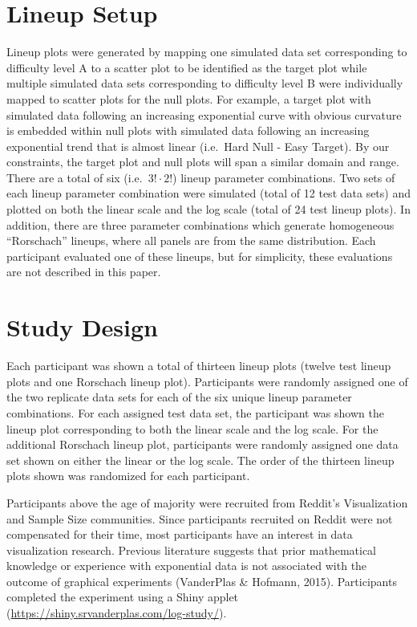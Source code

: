 \documentclass[print]{nuthesis}
\begin{document}
\hypertarget{lineup-setup}{%
\section{Lineup Setup}\label{lineup-setup}}

Lineup plots were generated by mapping one simulated data set corresponding to difficulty level A to a scatter plot to be identified as the target plot while multiple simulated data sets corresponding to difficulty level B were individually mapped to scatter plots for the null plots.
For example, a target plot with simulated data following an increasing exponential curve with obvious curvature is embedded within null plots with simulated data following an increasing exponential trend that is almost linear (i.e.~Hard Null - Easy Target).
By our constraints, the target plot and null plots will span a similar domain and range.
There are a total of six (i.e.~\(3!\cdot 2!\)) lineup parameter combinations.
Two sets of each lineup parameter combination were simulated (total of 12 test data sets) and plotted on both the linear scale and the log scale (total of 24 test lineup plots).
In addition, there are three parameter combinations which generate homogeneous ``Rorschach'' lineups, where all panels are from the same distribution. Each participant evaluated one of these lineups, but for simplicity, these evaluations are not described in this paper.

\hypertarget{study-design}{%
\section{Study Design}\label{study-design}}

Each participant was shown a total of thirteen lineup plots (twelve test lineup plots and one Rorschach lineup plot). Participants were randomly assigned one of the two replicate data sets for each of the six unique lineup parameter combinations.
For each assigned test data set, the participant was shown the lineup plot corresponding to both the linear scale and the log scale. For the additional Rorschach lineup plot, participants were randomly assigned one data set shown on either the linear or the log scale.
The order of the thirteen lineup plots shown was randomized for each participant.

Participants above the age of majority were recruited from Reddit's Visualization and Sample Size communities.
Since participants recruited on Reddit were not compensated for their time, most participants have an interest in data visualization research.
Previous literature suggests that prior mathematical knowledge or experience with exponential data is not associated with the outcome of graphical experiments (VanderPlas \& Hofmann, 2015).
Participants completed the experiment using a Shiny applet (\url{https://shiny.srvanderplas.com/log-study/}).
\end{document}
